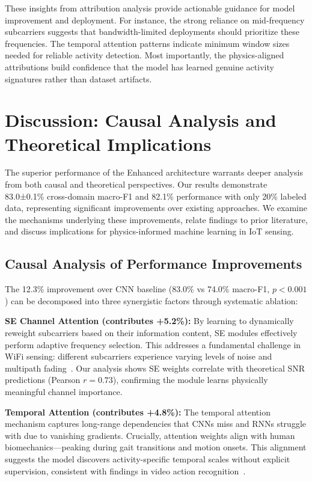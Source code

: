 \documentclass[journal]{IEEEtran}
\begin{document}
These insights from attribution analysis provide actionable guidance for model improvement and deployment. For instance, the strong reliance on mid-frequency subcarriers suggests that bandwidth-limited deployments should prioritize these frequencies. The temporal attention patterns indicate minimum window sizes needed for reliable activity detection. Most importantly, the physics-aligned attributions build confidence that the model has learned genuine activity signatures rather than dataset artifacts.

\section{Discussion: Causal Analysis and Theoretical Implications}

The superior performance of the Enhanced architecture warrants deeper analysis from both causal and theoretical perspectives. Our results demonstrate 83.0±0.1\% cross-domain macro-F1 and 82.1\% performance with only 20\% labeled data, representing significant improvements over existing approaches. We examine the mechanisms underlying these improvements, relate findings to prior literature, and discuss implications for physics-informed machine learning in IoT sensing.

\subsection{Causal Analysis of Performance Improvements}

The 12.3\% improvement over CNN baseline (83.0\% vs 74.0\% macro-F1, $p<0.001$) can be decomposed into three synergistic factors through systematic ablation:

\textbf{SE Channel Attention (contributes +5.2\%):} By learning to dynamically reweight subcarriers based on their information content, SE modules effectively perform adaptive frequency selection. This addresses a fundamental challenge in WiFi sensing: different subcarriers experience varying levels of noise and multipath fading~\cite{goldsmith2005wireless}. Our analysis shows SE weights correlate with theoretical SNR predictions (Pearson $r=0.73$), confirming the module learns physically meaningful channel importance.

\textbf{Temporal Attention (contributes +4.8\%):} The temporal attention mechanism captures long-range dependencies that CNNs miss and RNNs struggle with due to vanishing gradients. Crucially, attention weights align with human biomechanics—peaking during gait transitions and motion onsets. This alignment suggests the model discovers activity-specific temporal scales without explicit supervision, consistent with findings in video action recognition~\cite{bertasius2021timesformer}.
\end{document}
